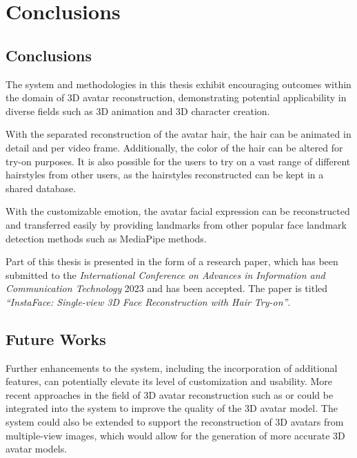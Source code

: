 \section{Conclusions}\label{sec:conclusions}

\subsection{Conclusions}

The system and methodologies in this thesis exhibit encouraging outcomes within the domain of 3D avatar reconstruction, demonstrating potential applicability in diverse fields such as 3D animation and 3D character creation.

With the separated reconstruction of the avatar hair, the hair can be animated in detail and per video frame. Additionally, the color of the hair can be altered for try-on purposes. It is also possible for the users to try on a vast range of different hairstyles from other users, as the hairstyles reconstructed can be kept in a shared database.

With the customizable emotion, the avatar facial expression can be reconstructed and transferred easily by providing landmarks from other popular face landmark detection methods such as MediaPipe methods.

Part of this thesis is presented in the form of a research paper, which has been submitted to the \textit{International Conference on Advances in Information and Communication Technology} 2023 and has been accepted. The paper is titled \textit{``InstaFace: Single-view 3D Face Reconstruction with Hair Try-on''}.

\subsection{Future Works}

Further enhancements to the system, including the incorporation of additional features, can potentially elevate its level of customization and usability. More recent approaches in the field of 3D avatar reconstruction such as  or  could be integrated into the system to improve the quality of the 3D avatar model. The system could also be extended to support the reconstruction of 3D avatars from multiple-view images, which would allow for the generation of more accurate 3D avatar models.